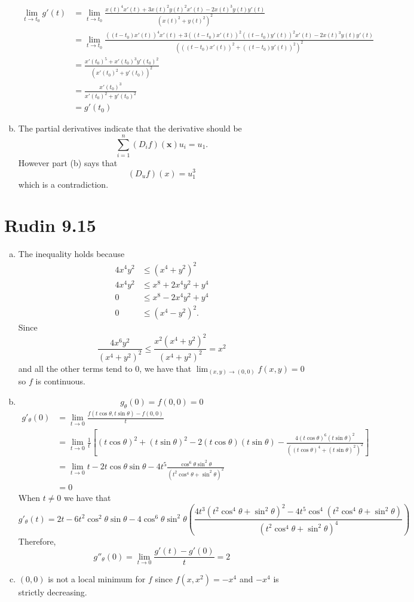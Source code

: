 \documentclass{article}
\begin{document}
\begin{enumerate}[(a)]
  \begin{align*}
    \lim_{t\to t_0} g'(t) 
    &= \lim_{t\to t_0} \frac{x(t)^4x'(t)+3x(t)^2y(t)^2 x'(t)- 2x(t)^3y(t)y'(t)}{(x(t)^2+y(t)^2)^2} \\
    &= \lim_{t\to t_0} \frac{((t-t_0)x'(t))^4x'(t)+3((t-t_0)x'(t))^2((t-t_0)y'(t))^2 x'(t)- 2x(t)^3y(t)y'(t)}{(((t-t_0)x'(t))^2+((t-t_0)y'(t))^2)^2} \\
    &= \frac{x'(t_0)^5 + x'(t_0)^3y'(t_0)^2}{(x'(t_0)^2 + y'(t_0))^2} \\
    &= \frac{x'(t_0)^3}{x'(t_0)^2 + y'(t_0)^2} \\
    &= g'(t_0) 
  \end{align*}
  \item The partial derivatives indicate that the derivative should be 
  \[
    \sum_{i=1}^n (D_i f)(\bm{x})u_i =  u_1.
  \]
  However part (b) says that 
  \[
    (D_u f)(x) = u_1^3
  \]
  which is a contradiction.
\end{enumerate}
\newpage 

\section*{Rudin 9.15}
\begin{enumerate}[(a)]
  \item The inequality holds because
  \begin{align*}
    4x^4y^2 &\leq (x^4 + y^2)^2 \\
    4x^4y^2 &\leq x^8 + 2x^4y^2 + y^4 \\
    0 &\leq x^8 - 2x^4y^2 + y^4 \\
    0 &\leq (x^4 - y^2)^2.
  \end{align*}
  Since 
  \[
    \frac{4x^6y^2}{(x^4+y^2)^2} \leq \frac{x^2(x^4+y^2)^2}{(x^4+y^2)^2} = x^2
  \]
  and all the other terms tend to $0$, 
  we have that $\lim_{(x,y) \to (0,0)} f(x,y) = 0$ so $f$ is continuous.
  \item
  \[
    g_\theta(0) = f(0,0) = 0
  \]
  \begin{align*}
    g'_\theta(0) &= \lim_{t \to 0} \frac{f(t\cos \theta, t\sin \theta)- f(0,0)}{t} \\
    &= \lim_{t \to 0} \frac{1}{t} \left[(t\cos \theta)^2 + (t\sin \theta)^2 - 2(t\cos \theta)(t\sin \theta) - \frac{4(t\cos \theta)^6(t\sin \theta)^2}{((t\cos \theta)^4 +(t\sin \theta)^2)^2}\right] \\
    &= \lim_{t \to 0} t -2t\cos \theta \sin \theta - 4t^5\frac{\cos^6 \theta \sin^2 \theta}{(t^2\cos^4 \theta + \sin^2 \theta)^2} \\
    &= 0
  \end{align*}
  When $t\neq 0$ we have that 
  \[
    g'_\theta(t) = 2t - 6t^2\cos^2 \theta \sin \theta - 4\cos^6\theta \sin^2 \theta \left(\frac{4t^3(t^2\cos^4 \theta + \sin^2 \theta)^2 -4t^5\cos^4 (t^2\cos^4 \theta + \sin^2 \theta)}{(t^2\cos^4 \theta + \sin^2 \theta)^4}\right)
  \]
  Therefore,
  \[
    g''_\theta(0) = \lim_{t \to 0} \frac{g'(t)- g'(0)}{t} = 2
  \]
  \item  $(0,0)$ is not a local minimum for $f$ since $f(x, x^2) = -x^4$
  and $-x^4$ is strictly decreasing.
\end{enumerate}
\newpage 
\end{document}
